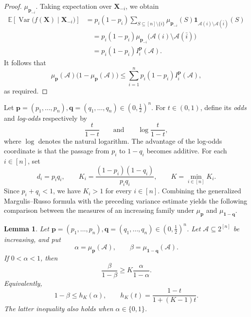 \documentclass[11pt]{article}
\numberwithin{equation}{section}
\newtheorem{lemma}[theorem]{Lemma}
\theoremstyle{definition}
\theoremstyle{remark}
\begin{document}
\begin{proof}
$\mu_{\mathbf p_{-i}}$. Taking expectation over $\mathbf X_{-i}$,
we obtain
\begin{align*}
 \mathbb E\left[
 \operatorname{Var}
 \bigl(f(\mathbf X)\mid\mathbf X_{-i}\bigr)
 \right]&=
 p_i(1-p_i)
 \sum_{S\subseteq[n]\setminus\{i\}}
 \mu_{\mathbf p_{-i}}(S)
 \mathbf 1_{\mathcal{A}(i)\setminus
 \mathcal{A}(\bar{i})}(S)\\
 &\quad=
 p_i(1-p_i)
 \mu_{\mathbf p_{-i}}
 \bigl(\mathcal{A}(i)\setminus\mathcal{A}(\bar{i})\bigr)\\
 &\quad=
 p_i(1-p_i)I_i^{\mathbf p}(\mathcal{A}).
 \label{eq:conditional-variance-influence}
\end{align*}
It follows that
$$
 \mu_{\mathbf p}(\mathcal{A})
 \bigl(1-\mu_{\mathbf p}(\mathcal{A})\bigr)
 \leq
 \sum_{i=1}^n
 p_i(1-p_i)I_i^{\mathbf p}(\mathcal{A}),
 $$
as required.
\end{proof}




Let $\mathbf p=(p_1,\ldots,p_n), \mathbf q=(q_1,\ldots,q_n)\in(0,\frac{1}{2})^n$.
For $t\in(0,1)$, define its \textit{odds} and \textit{log-odds} respectively by
\begin{equation*}
 \frac{t}{1-t}
 \qquad\text{and}\qquad
 \log\frac{t}{1-t},
\end{equation*}
where  $\log$ denotes the natural logarithm.
The advantage of the log-odds coordinate is that the
passage from $p_i$ to $1-q_i$ becomes additive.
For each $i\in[n]$, set
\begin{equation*}
 d_i=p_iq_i,
 \qquad
 K_i=\frac{(1-p_i)(1-q_i)}{p_iq_i},
 \qquad
 K=\min_{i\in[n]}K_i.
\end{equation*}
Since $p_i+q_i<1$, we have $K_i>1$ for every $i\in[n]$.
Combining the generalized Margulis--Russo formula with the preceding
variance estimate yields the following comparison between the measures
of an increasing family under $\mu_{\mathbf p}$ and
$\mu_{\mathbf{1-\mathbf q}}$.


\begin{lemma}\label{lem:logodds}
Let $\mathbf p=(p_1,\ldots,p_n), \mathbf q=(q_1,\ldots,q_n)\in(0,\frac{1}{2})^n$.
Let $\mathcal{A}\subseteq2^{[n]}$ be increasing, and put
\begin{equation*}
 \alpha=\mu_{\mathbf p}(\mathcal{A}),
 \qquad
 \beta=\mu_{\mathbf 1-\mathbf q}(\mathcal{A}).
\end{equation*}
If $0<\alpha<1$, then
\begin{equation*}
 \frac{\beta}{1-\beta}
 \geq
 K\frac{\alpha}{1-\alpha}.
\end{equation*}
Equivalently,
\begin{equation*}
 1-\beta\leq h_K(\alpha),
 \qquad
 h_K(t)=\frac{1-t}{1+(K-1)t}.
\end{equation*}
The latter inequality also holds when $\alpha\in\{0,1\}$.
\end{lemma}
\end{document}
